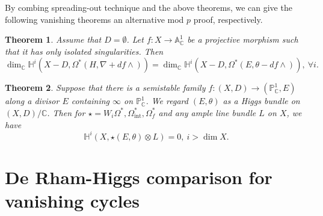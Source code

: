 \documentclass[12pt, a4paper]{article}
\newtheorem{theorem}{Theorem}[section]
\begin{document}
By combing spreading-out technique and the above theorems, we can give the following vanishing theorems an alternative mod $p$ proof, respectively.


\begin{theorem}
 Assume that $D=\emptyset$. Let $f:X\to\mathbb A^1_\mathbb{C}$ be a projective morphism such that it has only isolated singularities. Then
 $$
 \dim_\mathbb{C}\mathbb H^i(X-D,\Omega^*(H,\nabla+df\wedge))=\dim_\mathbb{C}\mathbb H^i(X-D,\Omega^*(E,\theta-df\wedge)),~\forall i.
 $$
\end{theorem}

  

\begin{theorem}
Suppose that there is a semistable family $f:(X,D)\to(\mathbb P^1_{\mathbb C},E)$ along a divisor $E$ containing $\infty$ on $\mathbb P^1_{\mathbb C}$.
We regard $(E,\theta)$ as a Higgs bundle on $(X,D)/\mathbb C$. Then for $\star=W_i\Omega^*,\Omega^*_\mathrm{int},\Omega^*_f$ and any ample line bundle $L$ on $X$, we have
 $$
 \mathbb H^i(X,\star(E,\theta)\otimes L)=0,~i>\dim X.
 $$  


\end{theorem}




\iffalse
\section{De Rham-Higgs comparison for vanishing cycles \uppercase\expandafter{}}
\end{document}
